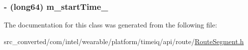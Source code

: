 \subsubsection[{m\+\_\+start\+Time\+\_\+}]{\setlength{\rightskip}{0pt plus 5cm}-\/ (long64) m\+\_\+start\+Time\+\_\+}\label{interface_route_segment_aac737b55a5fbf600894d4f7e0fe6fa89}


The documentation for this class was generated from the following file\+:\begin{DoxyCompactItemize}
\item 
src\+\_\+converted/com/intel/wearable/platform/timeiq/api/route/\hyperlink{_route_segment_8h}{Route\+Segment.\+h}\end{DoxyCompactItemize}
